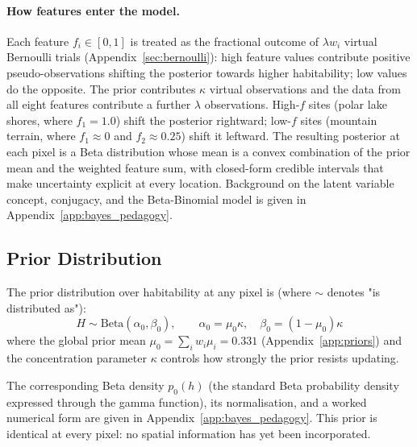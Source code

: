 \paragraph{How features enter the model.}
Each feature $f_i \in [0, 1]$ is treated as the fractional outcome of $\lambda w_i$ virtual Bernoulli trials (Appendix~\ref{sec:bernoulli}): high feature values contribute positive pseudo-observations shifting the posterior towards higher habitability; low values do the opposite.  The prior contributes $\kappa$ virtual observations and the data from all eight features contribute a further $\lambda$ observations.  High-$f$ sites (polar lake shores, where $f_1{=}1.0$) shift the posterior rightward; low-$f$ sites (mountain terrain, where $f_1{\approx}0$ and $f_2{\approx}0.25$) shift it leftward.  The resulting posterior at each pixel is a Beta distribution whose mean is a convex combination of the prior mean and the weighted feature sum, with closed-form credible intervals that make uncertainty explicit at every location.  Background on the latent variable concept, conjugacy, and the Beta-Binomial model is given in Appendix~\ref{app:bayes_pedagogy}.

\subsection{Prior Distribution}
\label{sec:prior}

The prior distribution over habitability at any pixel is (where $\sim$ denotes "is distributed as"):
\begin{equation}
  H \sim \mathrm{Beta}(\alpha_0, \beta_0), \qquad
  \alpha_0 = \mu_0\kappa, \quad \beta_0 = (1 - \mu_0)\kappa
  \label{eq:prior_dist}
\end{equation}
where the global prior mean $\mu_0 = \sum_{i} w_i \mu_i = 0.331$ (Appendix~\ref{app:priors}) and the concentration parameter $\kappa$ controls how strongly the prior resists updating.

The corresponding Beta density $p_0(h)$ (the standard Beta probability density expressed through the gamma function), its normalisation, and a worked numerical form are given in Appendix~\ref{app:bayes_pedagogy}.  This prior is identical at every pixel: no spatial information has yet been incorporated.

